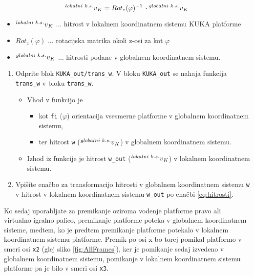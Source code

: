 \begin{mdframed}[backgroundcolor=yellow!20, shadow=true,roundcorner=8pt]

\begin{equation}\label{eq:hitrosti}
    \prescript{lokalni\,\,k.s.}{}v_K = Rot_z(\varphi)^{-1}\,\cdot\prescript{globalni\,\,k.s.}{}v_K
\end{equation}

\begin{itemize}
\item $\prescript{lokalni\,\,k.s.}{}v_K$ ... hitrost v lokalnem koordinatnem sistemu KUKA platforme
\item $Rot_z(\varphi)$ ... rotacijska matrika okoli z-osi za kot $\varphi$
\item $\prescript{globalni\,\,k.s.}{}v_K$ ... hitrosti podane v globalnem koordinatnem sistemu.
\end{itemize}


\begin{enumerate}
\item Odprite blok \verb"KUKA_out/trans_w". V bloku \verb"KUKA_out" se nahaja funkcija \verb"trans_w" v bloku \verb"trans_w".
\begin{itemize}
\item Vhod v funkcijo je
\begin{itemize}
\item kot \verb"fi" ($\varphi$) orientacija vsesmerne platforme v globalnem koordinatnem sistemu,
\item ter hitrost \verb"w" ($\prescript{globalni\,\,k.s.}{}v_K$) v globalnem koordinatnem sistemu.
\end{itemize}
\item Izhod iz funkcije je hitrost \verb"w_out" ($\prescript{lokalni\,\,k.s.}{}v_K$) v lokalnem koordinatnem sistemu.
\end{itemize}
\item Vpišite enačbo za transformacijo hitrosti v globalnem koordinatnem sistemu \verb"w" v hitrost v lokalnem koordinatnem sistemu \verb"w_out" po enačbi \ref{eq:hitrosti}.
\end{enumerate}

\end{mdframed}

Ko sedaj uporabljate za premikanje oziroma vodenje platforme pravo ali virtualno igralno palico, premikanje platforme poteka v globalnem koordinatnem sisteme, medtem, ko je predtem premikanje platforme potekalo v lokalnem koordinatnem sistemu platforme. Premik po osi x bo torej pomikal platformo v smeri osi \verb|x2| (glej sliko \ref{fig:AllFrames}), ker je pomikanje sedaj izvedeno v globalnem koordinatnem sistemu, pomikanje v lokalnem koordinatnem sistemu platforme pa je bilo v smeri osi \verb|x3|.

